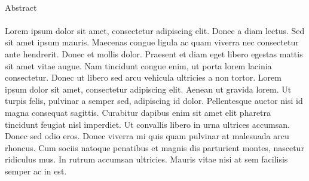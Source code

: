 \hspace{1cm}\\[5cm]
{\huge Abstract}
\\\HRule\\
Lorem ipsum dolor sit amet, consectetur adipiscing elit. Donec a diam lectus.
Sed sit amet ipsum mauris. Maecenas congue ligula ac quam viverra nec
consectetur ante hendrerit. Donec et mollis dolor. Praesent et diam eget libero
egestas mattis sit amet vitae augue. Nam tincidunt congue enim, ut porta lorem
lacinia consectetur. Donec ut libero sed arcu vehicula ultricies a non tortor.
Lorem ipsum dolor sit amet, consectetur adipiscing elit. Aenean ut gravida
lorem. Ut turpis felis, pulvinar a semper sed, adipiscing id dolor. Pellentesque
auctor nisi id magna consequat sagittis. Curabitur dapibus enim sit amet elit
pharetra tincidunt feugiat nisl imperdiet. Ut convallis libero in urna ultrices
accumsan. Donec sed odio eros. Donec viverra mi quis quam pulvinar at malesuada
arcu rhoncus. Cum sociis natoque penatibus et magnis dis parturient montes,
nascetur ridiculus mus. In rutrum accumsan ultricies. Mauris vitae nisi at sem
facilisis semper ac in est.
